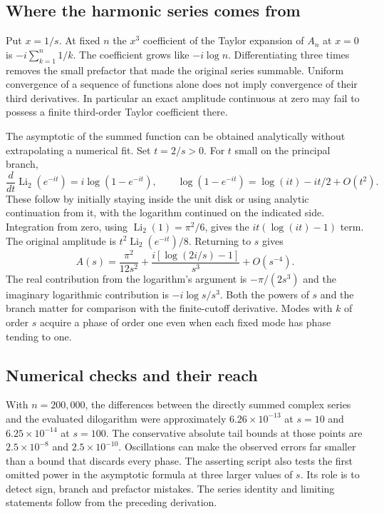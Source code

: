 \documentclass[11pt]{article}
\begin{document}
\subsection{Where the harmonic series comes from}
Put $x=1/s$. At fixed $n$ the $x^3$ coefficient of the Taylor expansion of $A_n$ at $x=0$ is $-i\sum_{k=1}^n1/k$. The coefficient grows like $-i\log n$. Differentiating three times removes the small prefactor that made the original series summable. Uniform convergence of a sequence of functions alone does not imply convergence of their third derivatives. In particular an exact amplitude continuous at zero may fail to possess a finite third-order Taylor coefficient there.

The asymptotic of the summed function can be obtained analytically without extrapolating a numerical fit. Set $t=2/s>0$. For $t$ small on the principal branch,
\[
 \frac{d}{dt}\operatorname{Li}_2(e^{-it})=i\log(1-e^{-it}),
 \qquad \log(1-e^{-it})=\log(it)-it/2+O(t^2).
\]
These follow by initially staying inside the unit disk or using analytic continuation from it, with the logarithm continued on the indicated side. Integration from zero, using $\operatorname{Li}_2(1)=\pi^2/6$, gives the $it(\log(it)-1)$ term. The original amplitude is $t^2\operatorname{Li}_2(e^{-it})/8$. Returning to $s$ gives
\begin{equation}
 A(s)=\frac{\pi^2}{12s^2}
   +\frac{i[\log(2i/s)-1]}{s^3}+O(s^{-4}).
\end{equation}
The real contribution from the logarithm's argument is $-\pi/(2s^3)$ and the imaginary logarithmic contribution is $-i\log s/s^3$. Both the powers of $s$ and the branch matter for comparison with the finite-cutoff derivative. Modes with $k$ of order $s$ acquire a phase of order one even when each fixed mode has phase tending to one.

\subsection{Numerical checks and their reach}
With $n=200{,}000$, the differences between the directly summed complex series and the evaluated dilogarithm were approximately $6.26\times10^{-13}$ at $s=10$ and $6.25\times10^{-14}$ at $s=100$. The conservative absolute tail bounds at those points are $2.5\times10^{-8}$ and $2.5\times10^{-10}$. Oscillations can make the observed errors far smaller than a bound that discards every phase. The asserting script also tests the first omitted power in the asymptotic formula at three larger values of $s$. Its role is to detect sign, branch and prefactor mistakes. The series identity and limiting statements follow from the preceding derivation.
\end{document}

